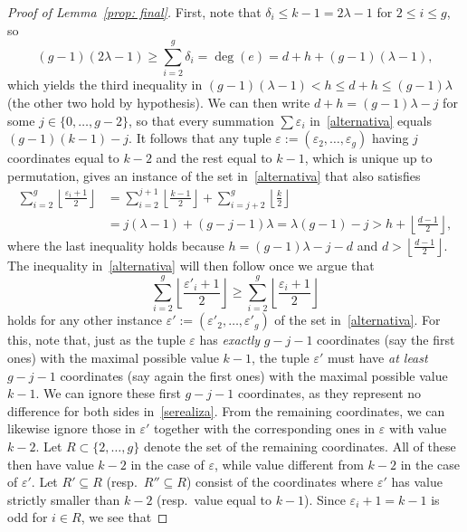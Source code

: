 \documentclass[amscd,amssymb,verbatim,10pt]{amsart}
\numberwithin{equation}{section}
\theoremstyle{plain}
\theoremstyle{definition}
\begin{document}
\begin{proof}[Proof of Lemma~\ref{prop: final}]
First, note that $\delta_i\leq k-1=2\lambda-1$ for $2\leq i\leq g$, so 
\[
(g-1)(2\lambda-1)\geq\sum_{i=2}^g\delta_i=\deg(e)=d+h+(g-1)(\lambda-1),
\]
which yields the third inequality in
$(g-1)(\lambda-1)<h\leq d+h\le (g-1)\lambda$
(the other two hold by hypothesis). We can then write $d+h=(g-1)\lambda-j$ for some $j\in\{0,\ldots,g-2\}$, so that every summation $\sum\varepsilon_i$ in~\eqref{alternativa} equals $(g-1)(k-1)-j$. It follows that any tuple $\varepsilon:=(\varepsilon_2,\ldots,\varepsilon_g)$ having $j$ coordinates equal to $k-2$ and the rest equal to $k-1$, which is unique up to permutation, gives an instance of the set in~\eqref{alternativa} that also satisfies
\begin{align*}
\sum_{i=2}^g\left\lfloor \frac{\varepsilon_i+1}{2} \right\rfloor &= \sum_{i=2}^{j+1}\left\lfloor \frac{k-1}{2}\right\rfloor+\sum_{i=j+2}^g\left\lfloor \frac{k}{2}  \right\rfloor\\&=j(\lambda-1)
+(g-j-1)\lambda=\lambda(g-1)-j>h+\left\lfloor\frac{d-1}2\right\rfloor,
\end{align*}
where the last inequality holds because $h=(g-1)\lambda-j-d$ and $d>\left\lfloor\frac{d-1}2\right\rfloor$. The inequality in~\eqref{alternativa} will then follow once we argue that
\begin{equation}\label{serealiza}
\sum_{i=2}^g\left\lfloor\frac{\varepsilon'_i+1}2\right\rfloor\geq \sum_{i=2}^g\left\lfloor\frac{\varepsilon_i+1}2\right\rfloor
\end{equation}
holds for any other instance $\varepsilon':=(\varepsilon'_2,\ldots,\varepsilon'_g)$ of the set in~\eqref{alternativa}. For this, note that, just as the tuple $\varepsilon$ has \emph{exactly} $g-j-1$ coordinates (say the first ones) with the maximal possible value $k-1$, the tuple $\varepsilon'$ must have \emph{at least} $g-j-1$ coordinates (say again the first ones) with the maximal possible value $k-1$. We can ignore these first $g-j-1$ coordinates, as they represent no difference for both sides in~\eqref{serealiza}. From the remaining coordinates, we can likewise ignore those in $\varepsilon'$ together with the corresponding ones in $\varepsilon$ with value $k-2$. Let $R\subset\{2,\ldots,g\}$ denote the set of the remaining coordinates. All of these then have value $k-2$ in the case of $\varepsilon$, while value different from $k-2$ in the case of $\varepsilon'$. Let $R'\subseteq R$ (resp.~$R''\subseteq R$) consist of the coordinates where $\varepsilon'$ has value strictly smaller than $k-2$ (resp.~value equal to $k-1$). Since $\varepsilon_i+1=k-1$  is odd for $i\in R$, we see that

\end{proof}
\end{document}
